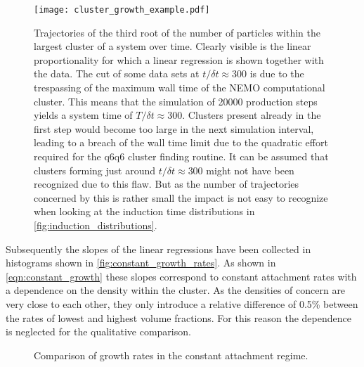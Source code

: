 \begin{figure}[ht]
\label{fig:cluster_growth_example}
\centering
\texttt{[image: cluster\_growth\_example.pdf]}
\caption[Largest cluster trajectories from production data with constant attachment rates]{Trajectories of the third root of the number of particles within the largest cluster of a system over time. Clearly visible is the linear proportionality for which a linear regression is shown together with the data. The cut of some data sets at $t/\delta t \approx 300$ is due to the trespassing of the maximum wall time of the NEMO computational cluster. This means that the simulation of 20000 production steps yields a system time of $T/\delta t \approx 300$. Clusters present already in the first step would become too large in the next simulation interval, leading to a breach of the wall time limit due to the quadratic effort required for the q6q6 cluster finding routine. It can be assumed that clusters forming just around $t/\delta t \approx 300$ might not have been recognized due to this flaw. But as the number of trajectories concerned by this is rather small the impact is not easy to recognize when looking at the induction time distributions in \autoref{fig:induction_distributions}.}
\label{fig:cluster_growth_example}
\end{figure}

Subsequently the slopes of the linear regressions have been collected in histograms shown in \autoref{fig:constant_growth_rates}. As shown in \autoref{eqn:constant_growth} these slopes correspond to constant attachment rates with a dependence on the density within the cluster. As the densities of concern are very close to each other, they only introduce a relative difference of 0.5\% between the rates of lowest and highest volume fractions. For this reason the dependence is neglected for the qualitative comparison.\\ 

\begin{figure}[ht]
\begin{center}
 \hspace{0.5cm}
\caption[Constant attachment rate measurements from production data]{Comparison of growth rates in the constant attachment regime.}
\label{fig:constant_growth_rates}
\end{center}
\end{figure}

